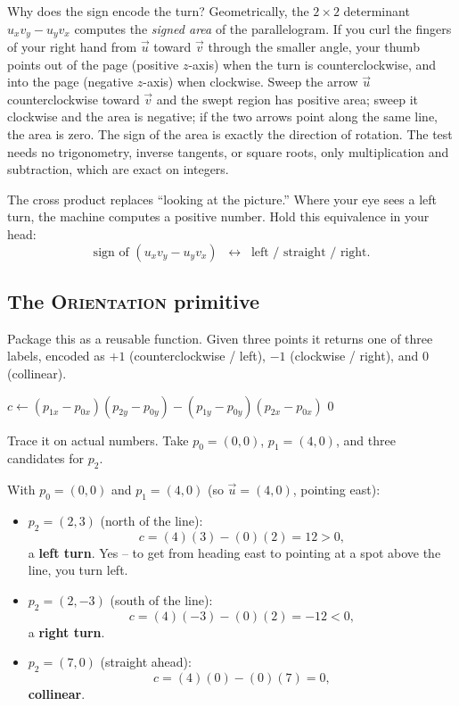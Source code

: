 Why does the sign encode the turn? Geometrically, the $2 \times 2$ determinant
$u_x v_y - u_y v_x$ computes the \emph{signed area} of the parallelogram. If you
curl the fingers of your right hand from $\vec{u}$ toward $\vec{v}$ through the
smaller angle, your thumb points out of the page (positive $z$-axis) when the turn
is counterclockwise, and into the page (negative $z$-axis) when clockwise.
Sweep the arrow $\vec{u}$ counterclockwise toward $\vec{v}$ and the swept region
has positive area; sweep it clockwise and the area is negative; if the two arrows
point along the same line, the area is zero. The sign of the area is exactly the
direction of rotation. The test needs no trigonometry, inverse tangents, or
square roots, only multiplication and subtraction, which are exact on integers.

\begin{focusbox}
The cross product replaces ``looking at the picture.'' Where your eye sees a left
turn, the machine computes a positive number. Hold this equivalence in your head:
\[
  \text{sign of } (u_x v_y - u_y v_x)
  \;\;\longleftrightarrow\;\;
  \text{left / straight / right.}
\]
\end{focusbox}

\subsection{The \textsc{Orientation} primitive}

Package this as a reusable function. Given three points it returns one of three
labels, encoded as $+1$ (counterclockwise / left), $-1$ (clockwise / right), and
$0$ (collinear).

\begin{algorithm}[H]
\caption{\textsc{Orientation}($p_0, p_1, p_2$)}
$c \leftarrow (p_{1x} - p_{0x})(p_{2y} - p_{0y}) - (p_{1y} - p_{0y})(p_{2x} - p_{0x})$\;
\Return $0$\;
\end{algorithm}

Trace it on actual numbers. Take $p_0 = (0,0)$, $p_1 = (4,0)$, and three
candidates for $p_2$.

\begin{example}\label{ch32:orient-trace}
With $p_0 = (0,0)$ and $p_1 = (4,0)$ (so $\vec{u} = (4,0)$, pointing east):
\begin{itemize}
  \item $p_2 = (2, 3)$ (north of the line):
        \[ c = (4)(3) - (0)(2) = 12 > 0, \]
        a \textbf{left turn}. Yes -- to get from heading east to pointing at a spot
        above the line, you turn left. \checkmark
  \item $p_2 = (2, -3)$ (south of the line):
        \[ c = (4)(-3) - (0)(2) = -12 < 0, \]
        a \textbf{right turn}. \checkmark
  \item $p_2 = (7, 0)$ (straight ahead):
        \[ c = (4)(0) - (0)(7) = 0, \]
        \textbf{collinear}. \checkmark
\end{itemize}
\end{example}

